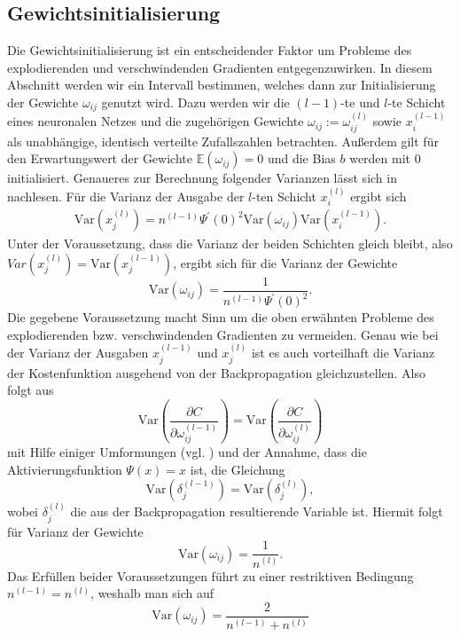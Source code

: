 \subsection{Gewichtsinitialisierung}
\label{subsec:gewichtsinitialisierung}
Die Gewichtsinitialisierung ist ein entscheidender Faktor um Probleme des explodierenden und verschwindenden Gradienten
entgegenzuwirken. In diesem Abschnitt werden wir ein Intervall bestimmen, welches dann zur Initialisierung der Gewichte
$\omega_{ij}$ genutzt wird. Dazu werden wir die $(l-1)$-te und $l$-te Schicht eines neuronalen Netzes und die
zugehörigen Gewichte $\omega_{ij}:=\omega_{ij}^{(l)}$ sowie $x_{i}^{(l-1)}$ als unabhängige, identisch verteilte
Zufallszahlen betrachten. Außerdem gilt für den Erwartungswert der Gewichte $\mathbb{E}(\omega_{ij})=0$ und die Bias $b$
werden mit $0$ initialisiert. Genaueres zur Berechnung folgender Varianzen lässt sich in
\cite[191-195]{calinDeepLearningArchitectures2020} nachlesen. Für die Varianz der Ausgabe der $l$-ten Schicht
$x_i^{(l)}$ ergibt sich
\begin{align*}
    \mathrm{Var}(x_j^{(l)}) = n^{(l-1)} \Psi^{\prime}(0)^2 \mathrm{Var}(\omega_{ij}) \mathrm{Var}(x_i^{(l-1)}).
\end{align*}
Unter der Voraussetzung, dass die Varianz der beiden Schichten gleich bleibt, also \linebreak
$Var(x_j^{(l)})=\mathrm{Var}(x_j^{(l-1)})$, ergibt sich für die Varianz der Gewichte
\[
        \mathrm{Var}(\omega_{ij}) = \frac{1}{n^{(l-1)}\Psi^{\prime}(0)^2}.
\]
Die gegebene Voraussetzung macht Sinn um die oben erwähnten Probleme des explodierenden bzw. verschwindenden Gradienten
zu vermeiden. Genau wie bei der Varianz der Ausgaben $x_j^{(l-1)}$ und $x_j^{(l)}$ ist es auch vorteilhaft die Varianz
der Kostenfunktion ausgehend von der Backpropagation gleichzustellen. Also folgt aus
\[
    \mathrm{Var}\left(\frac{\partial C}{\partial \omega_{ij}^{(l-1)}}\right) = \mathrm{Var}\left(\frac{\partial C}{\partial \omega_{ij}^{(l)}}\right)
\]
mit Hilfe einiger Umformungen (vgl. \cite[191-195]{calinDeepLearningArchitectures2020}) und der Annahme, dass die
Aktivierungsfunktion $\Psi(x)=x$ ist, die Gleichung
\[
    \mathrm{Var}(\delta_j^{(l-1)}) = \mathrm{Var}(\delta_j^{(l)}),
\]
wobei $\delta_j^{(l)}$ die aus der Backpropagation resultierende Variable ist. Hiermit folgt für Varianz der Gewichte
\[
    \mathrm{Var}(\omega_{ij}) = \frac{1}{n^{(l)}}.
\]
Das Erfüllen beider Voraussetzungen führt zu einer restriktiven Bedingung $n^{(l-1)} = n^{(l)}$, weshalb man sich auf
\[
    \mathrm{Var}(\omega_{ij})= \frac{2}{n^{(l-1)} + n^{(l)}}
\]
